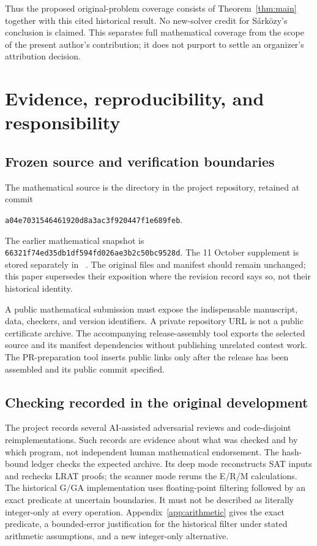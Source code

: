 Thus the proposed original-problem coverage consists of Theorem~\ref{thm:main} together with this cited historical result. No new-solver credit for S\'ark\"ozy's conclusion is claimed. This separates full mathematical coverage from the scope of the present author's contribution; it does not purport to settle an organizer's attribution decision.

\section{Evidence, reproducibility, and responsibility}\label{sec:evidence}
\subsection{Frozen source and verification boundaries}
The mathematical source is the  directory in the project repository, retained at commit
\begin{center}\small\texttt{a04e7031546461920d8a3ac3f920447f1e689feb}.\end{center}
The earlier mathematical snapshot is
\texttt{66321f74ed35db1df594fd026ae3b2c50bc9528d}.
The 11 October supplement is stored separately in
~\cite{TailReplay}.
The original files and manifest should remain unchanged; this paper supersedes their exposition where the revision record says so, not their historical identity.

A public mathematical submission must expose the indispensable manuscript, data, checkers, and version identifiers. A private repository URL is not a public certificate archive. The accompanying release-assembly tool exports the selected source and its manifest dependencies without publishing unrelated contest work. The PR-preparation tool inserts public links only after the release has been assembled and its public commit specified.

\subsection{Checking recorded in the original development}
The project records several AI-assisted adversarial reviews and code-disjoint reimplementations. Such records are evidence about what was checked and by which program, not independent human mathematical endorsement. The hash-bound ledger  checks the expected archive. Its deep mode reconstructs SAT inputs and rechecks LRAT proofs; the scanner mode reruns the E/R/M calculations. The historical G/GA implementation uses floating-point filtering followed by an exact predicate at uncertain boundaries. It must not be described as literally integer-only at every operation. Appendix~\ref{app:arithmetic} gives the exact predicate, a bounded-error justification for the historical filter under stated arithmetic assumptions, and a new integer-only alternative.

